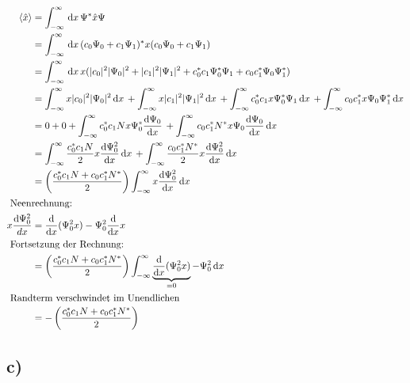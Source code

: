 \begin{align}
    \langle \hat x \rangle &= \int_{-\infty}^{\infty} \,\mathrm{d}x\, \Psi^* \hat x \Psi \\
    &=\int_{-\infty}^{\infty} \,\mathrm{d}x\, (c_0 \Psi _0 + c_1 \Psi _1)^*x(c_0 \Psi _0+c_1 \Psi _1) \nonumber\\
    &=\int_{-\infty}^{\infty} \,\mathrm{d}x\, x (\lvert c_0\rvert^2\lvert\Psi _0\rvert^2+\lvert c_1\rvert^2 \lvert\Psi _1\rvert^2 + c_0^* c_1 \Psi_0^*\Psi _1+c_0 c_1^* \Psi _0 \Psi _1^*) \nonumber\\
    &=\int_{-\infty}^{\infty} x \lvert c_0\rvert^2 \lvert\Psi _0\rvert^2 \,\mathrm{d}x\, +\int_{-\infty}^{\infty}  
    x \lvert c_1\rvert^2 \lvert\Psi _1\rvert^2 \,\mathrm{d}x\, +\int_{-\infty}^{\infty} c_0^* c_1 x \Psi_0^*\Psi_1 \,\mathrm{d}x\,
    + \int_{-\infty}^{\infty}  c_0 c_1^*x \Psi _0 \Psi_1^* \,\mathrm{d}x\, \nonumber\\
    &= 0+0+\int_{-\infty}^{\infty} c_0^*c_1 N x \Psi _0^* \frac{\mathrm{d}\Psi _0}{\mathrm{d}x} \,+\int_{-\infty}^{\infty}  c_0 c_1^* N^* x \Psi _0 \frac{\mathrm{d}\Psi _0}{\mathrm{d}x} \,\mathrm{d}x\, \nonumber\\
    &= \int_{-\infty}^{\infty} \frac{c_0^*c_1N}{2}x \frac{\mathrm{d} \Psi _0^2}{\mathrm{d}x}  \,\mathrm{d}x\, +\int_{-\infty}^{\infty} \frac{c_0 c_1^* N^*}{2}x \frac{\mathrm{d}\Psi _0^2 }{\mathrm{d}x} \,\mathrm{d}x\, \nonumber\\
    &=\left(\frac{c_0^* c_1 N+c_0c_1^*N^*}{2}\right)\int_{-\infty}^{\infty} x \frac{\mathrm{d}\Psi _0^2 }{\mathrm{d}x} \,\mathrm{d}x\, \nonumber\\
    \intertext {
        Neenrechnung:
    }    
    x\frac{\mathrm{d}\Psi _0^2}{dx} &= \frac{\mathrm{d}}{\mathrm{d}x}(\Psi _0^2 x)-\Psi_0^2 \frac{\mathrm{d}}{\mathrm{d}x}x\\
    \intertext{
        Fortsetzung der Rechnung:
    }
    &= \left(\frac{c_0^* c_1 N+c_0c_1^*N^*}{2}\right) \int_{-\infty}^{\infty} \underbrace{\frac{\mathrm{d}}{\mathrm{d}x}(\Psi _0^2 x)}_{=0} -\Psi_0^2 \,\mathrm{d}x\, \\
    \intertext{
        Randterm verschwindet im Unendlichen
    }
    &= -\left(\frac{c_0^* c_1 N+c_0c_1^*N^*}{2}\right)
\end{align}


\subsection{c)}
 
